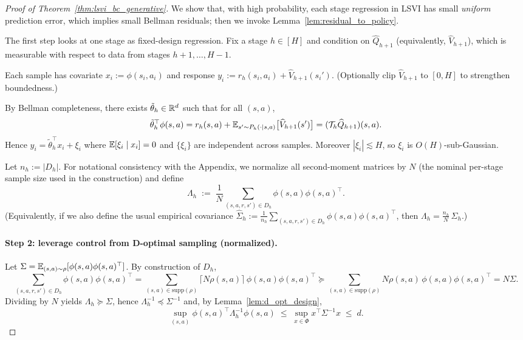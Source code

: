 \begin{proof}[Proof of Theorem~\ref{thm:lsvi_bc_generative}]
We show that, with high probability, each stage regression in LSVI has small
\emph{uniform} prediction error, which implies small Bellman residuals; then we
invoke Lemma~\ref{lem:residual_to_policy}.

The first step looks at one stage as fixed-design regression.
Fix a stage $h\in[H]$ and condition on $\widehat Q_{h+1}$ (equivalently,
$\widehat V_{h+1}$), which is measurable with respect to data from stages
$h+1,\dots,H-1$.

Each sample has covariate $x_i := \phi(s_i,a_i)$ and response
$y_i := r_h(s_i,a_i) + \widehat V_{h+1}(s_i')$.
(Optionally clip $\widehat V_{h+1}$ to $[0,H]$ to strengthen boundedness.)

By Bellman completeness, there exists $\tilde\theta_h\in\mathbb{R}^d$ such that for all
$(s,a)$,
\[
\tilde\theta_h^\top \phi(s,a)
=
r_h(s,a) + \mathbb{E}_{s'\sim P_h(\cdot\mid s,a)}\big[\widehat V_{h+1}(s')\big]
=
(\mathcal{T}_h \widehat Q_{h+1})(s,a).
\]
Hence $y_i = \tilde\theta_h^\top x_i + \xi_i$ where $\mathbb{E}[\xi_i\mid x_i]=0$ and
$\{\xi_i\}$ are independent across samples. Moreover $|\xi_i|\lesssim H$, so
$\xi_i$ is $O(H)$-sub-Gaussian.

Let $n_h:=|D_h|$. For notational consistency with the Appendix, we normalize all
second-moment matrices by $N$ (the nominal per-stage sample size used in the construction)
and define
\[
\Lambda_h
\;:=\;
\frac{1}{N}\sum_{(s,a,r,s')\in D_h}\phi(s,a)\phi(s,a)^\top.
\]
(Equivalently, if we also define the usual empirical covariance
$\widehat\Sigma_h := \frac{1}{n_h}\sum_{(s,a,r,s')\in D_h}\phi(s,a)\phi(s,a)^\top$,
then $\Lambda_h = \frac{n_h}{N}\,\widehat\Sigma_h$.)

\paragraph{Step 2: leverage control from D-optimal sampling (normalized).}
Let $\Sigma=\mathbb{E}_{(s,a)\sim\rho}[\phi(s,a)\phi(s,a)^\top]$. By construction of $D_h$,
\[
\sum_{(s,a,r,s')\in D_h}\phi(s,a)\phi(s,a)^\top
=
\sum_{(s,a)\in\mathrm{supp}(\rho)} \lceil N\rho(s,a)\rceil\, \phi(s,a)\phi(s,a)^\top
\succeq
\sum_{(s,a)\in\mathrm{supp}(\rho)} N\rho(s,a)\, \phi(s,a)\phi(s,a)^\top
=
N\Sigma.
\]
Dividing by $N$ yields $\Lambda_h\succeq \Sigma$, hence $\Lambda_h^{-1}\preceq \Sigma^{-1}$ and,
by Lemma~\ref{lem:d_opt_design},
\[
\sup_{(s,a)} \phi(s,a)^\top \Lambda_h^{-1}\phi(s,a)
\;\le\;
\sup_{x\in\Phi} x^\top\Sigma^{-1}x
\;\le\; d.
\]


\end{proof}
